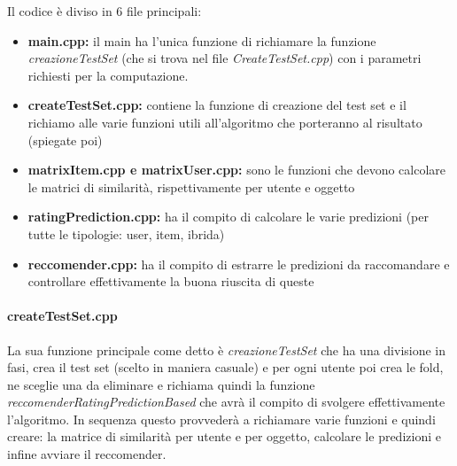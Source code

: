 \documentclass[12pt]{article}
\begin{document}
Il codice è diviso in 6 file principali:
\begin{itemize}
\item \textbf{main.cpp: } il main ha l'unica funzione di richiamare la funzione \textit{creazioneTestSet} (che si trova nel file \textit{CreateTestSet.cpp}) con i parametri richiesti per la computazione.
\item \textbf{createTestSet.cpp: } contiene la funzione di creazione del test set e il richiamo alle varie funzioni utili all'algoritmo che porteranno al risultato (spiegate poi)
\item \textbf{matrixItem.cpp e matrixUser.cpp:  } sono le funzioni che devono calcolare le matrici di similarità, rispettivamente per utente e oggetto
\item \textbf{ratingPrediction.cpp: } ha il compito di calcolare le varie predizioni (per tutte le tipologie: user, item, ibrida)
\item \textbf{reccomender.cpp: } ha il compito di estrarre le predizioni da raccomandare e controllare effettivamente la buona riuscita di queste
\end{itemize}

\paragraph*{createTestSet.cpp} La sua funzione principale come detto è \textit{creazioneTestSet} che ha una divisione in fasi, crea il test set (scelto in maniera casuale) e per ogni utente poi crea le fold, ne sceglie una da eliminare e richiama quindi la funzione \textit{reccomenderRatingPredictionBased} che avrà il compito di svolgere effettivamente l'algoritmo.
In sequenza questo provvederà a richiamare varie funzioni e quindi creare: la matrice di similarità per utente e per oggetto, calcolare le predizioni e infine avviare il reccomender.
\end{document}
